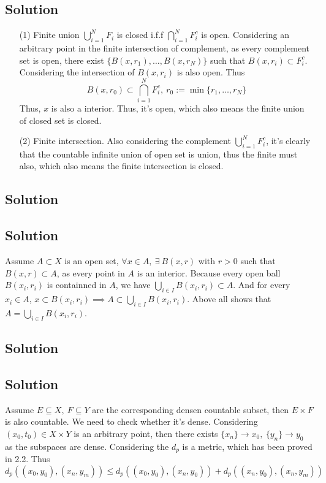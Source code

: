\documentclass{article}
\begin{document}
\subsection{Solution}
\begin{enumerate}
    \item[(1)] Finite union \(\bigcup_{i = 1}^N F_i\) is closed i.f.f \(\bigcap_{i = 1}^N F_i^c\) is open.
        Considering an arbitrary point in the finite intersection of complement, as every complement set is open, there exist \(\{B(x, r_1), \ldots, B(x, r_N)\}\) such that \(B(x, r_i) \subset F_i^c \). Considering the intersection of \(B(x, r_i)\) is also open. Thus 
        \[B(x, r_0) \subset \bigcap_{i = 1}^N F_i^c,\ r_0 := \min\{r_1, \ldots, r_N\}\]
        Thus, \(x\) is also a interior. Thus, it's open, which also means the finite union of closed set is closed.
        
    \item[(2)] Finite intersection. Also considering the complement \(\bigcup_{i = 1}^N F_i^c\), it's clearly that the countable infinite union of open set is union, thus the finite must also, which also means the finite intersection is closed.
\end{enumerate}

\subsection{Solution}

\subsection{Solution}
Assume \(A \subset X\) is an open set, \(\forall x \in A,\ \exists\ B(x, r)\) with \(r > 0\) such that \(B(x, r) \subset A\), as every point in \(A\) is an interior. Because every open ball \(B(x_i, r_i)\) is containned in \(A\), we have \(\bigcup_{i \in I}B(x_i, r_i) \subset A\). And for every \(x_i \in A\), \(x \subset B(x_i, r_i) \implies A \subset \bigcup_{i \in I} B(x_i, r_i)\). Above all shows that \(A = \bigcup_{i \in I} B(x_i, r_i)\).

\subsection{Solution}


\subsection{Solution}
Assume \(E \subseteq X,\ F \subseteq Y\) are the corresponding densen countable subset, then \(E \times F\) is also countable. We need to check whether it's dense. Considering \((x_0, t_0) \in X \times Y\) is an arbitrary point, then there exists \(\{x_n\} \to x_0,\ \{y_n\} \to y_0\) as the subspaces are dense. Considering the \(d_p\) is a metric, which has been proved in 2.2. Thus 
\[d_p((x_0, y_0), (x_n, y_m)) \le d_p((x_0, y_0), (x_n, y_0)) + d_p((x_n, y_0), (x_n, y_m))\]
\end{document}
